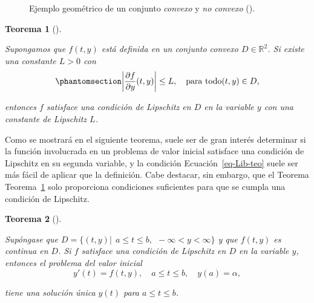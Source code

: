\documentclass[
  spanish,
  us-letterpaper,
  DIV=11,
  numbers=noendperiod]{scrreprt}
\theoremstyle{definition}
\theoremstyle{plain}
\newtheorem{theorem}{Teorema}[chapter]
\theoremstyle{remark}
\begin{document}
\begin{figure}


\caption{\label{fig-convx-set}Ejemplo geométrico de un conjunto
\emph{convexo} y \emph{no convexo} ().}

\end{figure}%

\begin{theorem}[]\protect\hypertarget{thm-Lib-teo}{}\label{thm-Lib-teo}

Supongamos que \(f(t, y)\) está definida en un conjunto convexo
\(D \in \mathbb{R}^2\). Si existe una constante \(L > 0\) con
\begin{equation}\phantomsection\label{eq-Lib-teo}{
\left|\dfrac{\partial f}{\partial y}(t,y) \right| \leq L, \quad \text{para todo} (t,y)\in D,
}\end{equation}

entonces \(f\) satisface una condición de Lipschitz en \(D\) en la
variable \(y\) con una constante de Lipschitz \(L\).

\end{theorem}

Como se mostrará en el siguiente teorema, suele ser de gran interés
determinar si la función involucrada en un problema de valor inicial
satisface una condición de Lipschitz en su segunda variable, y la
condición Ecuación~\ref{eq-Lib-teo} suele ser más fácil de aplicar que
la definición. Cabe destacar, sin embargo, que el Teorema
Teorema~\ref{thm-Lib-teo} solo proporciona condiciones suficientes para
que se cumpla una condición de Lipschitz.

\begin{theorem}[]\protect\hypertarget{thm-uniq-sol}{}\label{thm-uniq-sol}

Supóngase que
\(D = \{(t, y) | \ \ a \leq t \leq b, \ \  -\infty < y < \infty \}\) y
que \(f (t, y)\) es continua en \(D\). Si \(f\) satisface una condición
de Lipschitz en \(D\) en la variable \(y\), entonces el problema del
valor inicial \[
y'(t)= f(t,y), \quad a\leq t \leq b, \quad y(a) = \alpha,
\]

tiene una solución única \(y(t)\) para \(a\leq t \leq b\).

\end{theorem}
\end{document}
